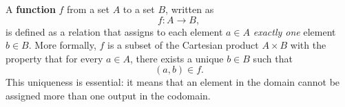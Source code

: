 \documentclass[11pt,openany]{article}
\begin{document}

\newpage
{}
\begin{remark*}
A \textbf{function} $f$ from a set $A$ to a set $B$, written as
\[
f: A \to B,
\]
is defined as a relation that assigns to each element $a \in A$ \emph{exactly one} element $b \in B$. More formally, $f$ is a subset of the Cartesian product $A \times B$ with the property that for every $a \in A$, there exists a unique $b \in B$ such that 
\[
(a,b) \in f.
\]
This uniqueness is essential: it means that an element in the domain cannot be assigned more than one output in the codomain.
\end{remark*}\vspace{40pt}
\end{document}
